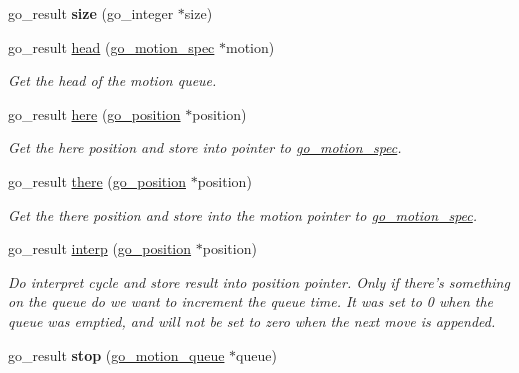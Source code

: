 \begin{DoxyCompactItemize}
\item 
\hypertarget{structgomotion_1_1go__motion__queue_a9eb929528abd0d19d272110c67236dce}{go\-\_\-result {\bfseries size} (go\-\_\-integer $\ast$size)}\label{structgomotion_1_1go__motion__queue_a9eb929528abd0d19d272110c67236dce}

\item 
go\-\_\-result \hyperlink{structgomotion_1_1go__motion__queue_a3fe40223c4ad5a19b929b192d7cead64}{head} (\hyperlink{structgomotion_1_1go__motion__spec}{go\-\_\-motion\-\_\-spec} $\ast$motion)
\begin{DoxyCompactList}\small\item\em Get the head of the motion queue. \end{DoxyCompactList}\item 
go\-\_\-result \hyperlink{structgomotion_1_1go__motion__queue_ab45a3644aac5d496e758db38a3553037}{here} (\hyperlink{structgomotion_1_1go__position}{go\-\_\-position} $\ast$position)
\begin{DoxyCompactList}\small\item\em Get the here position and store into pointer to \hyperlink{structgomotion_1_1go__motion__spec}{go\-\_\-motion\-\_\-spec}. \end{DoxyCompactList}\item 
go\-\_\-result \hyperlink{structgomotion_1_1go__motion__queue_ad5de56ac17a7e86ea66627376b668bd2}{there} (\hyperlink{structgomotion_1_1go__position}{go\-\_\-position} $\ast$position)
\begin{DoxyCompactList}\small\item\em Get the there position and store into the motion pointer to \hyperlink{structgomotion_1_1go__motion__spec}{go\-\_\-motion\-\_\-spec}. \end{DoxyCompactList}\item 
go\-\_\-result \hyperlink{structgomotion_1_1go__motion__queue_a3cfb410e307b2bd3af0c64406364edfc}{interp} (\hyperlink{structgomotion_1_1go__position}{go\-\_\-position} $\ast$position)
\begin{DoxyCompactList}\small\item\em Do interpret cycle and store result into position pointer. Only if there's something on the queue do we want to increment the queue time. It was set to 0 when the queue was emptied, and will not be set to zero when the next move is appended. \end{DoxyCompactList}\item 
\hypertarget{structgomotion_1_1go__motion__queue_a59932f32a219889d188e2b4184b396c2}{go\-\_\-result {\bfseries stop} (\hyperlink{structgomotion_1_1go__motion__queue}{go\-\_\-motion\-\_\-queue} $\ast$queue)}\label{structgomotion_1_1go__motion__queue_a59932f32a219889d188e2b4184b396c2}


\end{DoxyCompactItemize}
